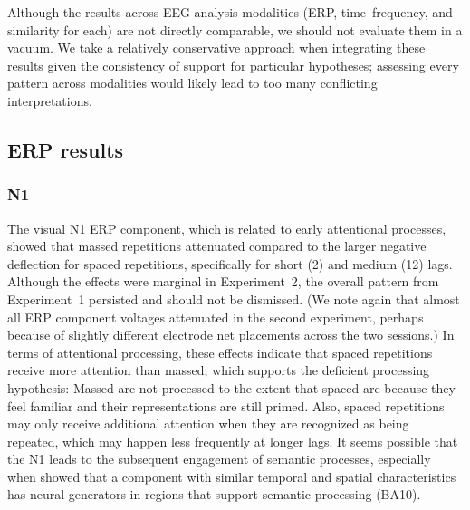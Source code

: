 Although the results across EEG analysis modalities (ERP, time--frequency, and similarity for each) are not directly comparable, we should not evaluate them in a vacuum.  We take a relatively conservative approach when integrating these results given the consistency of support for particular hypotheses; assessing every pattern across modalities would likely lead to too many conflicting interpretations.


\subsection{ERP results}



\subsubsection{N1}


The visual N1 ERP component, which is related to early attentional processes, showed that massed repetitions attenuated compared to the larger negative deflection for spaced repetitions, specifically for short (2) and medium (12) lags.  Although the effects were marginal in Experiment~2, the overall pattern from Experiment~1 persisted and should not be dismissed. (We note again that almost all ERP component voltages attenuated in the second experiment, perhaps because of slightly different electrode net placements across the two sessions.)  In terms of attentional processing, these effects indicate that spaced repetitions receive more attention than massed, which supports the deficient processing hypothesis: Massed are not processed to the extent that spaced are because they feel familiar and their representations are still primed.  Also, spaced repetitions may only receive additional attention when they are recognized as being repeated, which may happen less frequently at longer lags.  It seems possible that the N1 leads to the subsequent engagement of semantic processes, especially when  showed that a component with similar temporal and spatial characteristics has neural generators in regions that support semantic processing (BA10).

